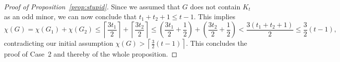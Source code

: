 \documentclass[11pt,reqno,oneside]{amsart}
\theoremstyle{definition}
\newcommand\1{\mathbf{1}}
\let\leq\leqslant
\begin{document}
\begin{proof}[Proof of Proposition~\ref{prop:stupid}]
Since we assumed that $G$ does not contain $K_t$ as an odd minor, we can now conclude that $t_1+t_2+1 \leq t-1$. This implies
\[
\chi(G)=\chi(G_1)+\chi(G_2) \leq \left\lceil\frac{3t_1}{2}\right\rceil+\left\lceil\frac{3t_2}{2}\right\rceil \leq \left(\frac{3t_1}{2}+\frac{1}{2}\right)+\left(\frac{3t_2}{2}+\frac{1}{2}\right)<\frac{3(t_1+t_2+1)}{2} \leq \frac{3}{2}(t-1),
\]
contradicting our initial assumption $\chi(G)>\left\lceil\frac{3}{2}(t-1)\right\rceil$. This concludes the proof of Case~2 and thereby of the whole proposition. 
\end{proof}
\end{document}
